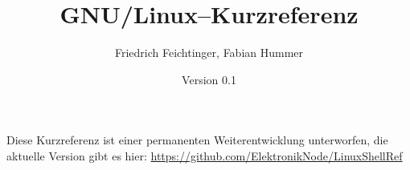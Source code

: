 \documentclass[11pt]{article}
\title{\textbf{GNU/Linux--Kurzreferenz}}
\author{Friedrich Feichtinger, Fabian Hummer}
\date{Version 0.1}
\begin{document}
\maketitle

Diese Kurzreferenz ist einer permanenten Weiterentwicklung unterworfen, die aktuelle Version gibt es hier: \url{https://github.com/ElektronikNode/LinuxShellRef}














\end{document}
